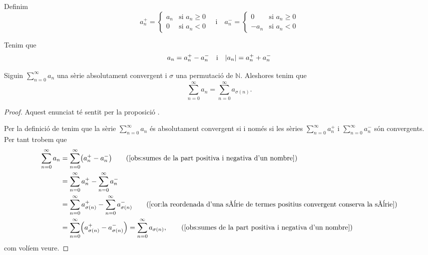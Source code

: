 \documentclass[../../Main.tex]{subfiles}
\begin{document}
	\begin{notation}
		\label{notation:part positiva d'un nombre}
		\label{notation:part negativa d'un nombre}
		Definim
		\[a^{+}_{n}=\begin{cases}
			a_{n} & \text{si }a_{n}\geq0 \\
			0 & \text{si }a_{n}<0
		\end{cases}\quad\text{i}\quad
		a^{-}_{n}=\begin{cases}
			0 & \text{si }a_{n}\geq0 \\
			-a_{n} & \text{si }a_{n}<0
		\end{cases}\]
	\end{notation}
	\begin{observation}
		\label{obs:sumes de la part positiva i negativa d'un nombre}
		Tenim que
		\[a_{n}=a^{+}_{n}-a^{-}_{n}\quad\text{i}\quad\abs{a_{n}}=a^{+}_{n}+a^{-}_{n}\]
	\end{observation}
	\begin{lemma}
		Siguin \(\sum_{n=0}^{\infty}a_{n}\) una sèrie absolutament convergent i \(\sigma\) una permutació de \(\mathbb{N}\). Aleshores tenim que
		\[\sum_{n=0}^{\infty}a_{n}=\sum_{n=0}^{\infty}a_{\sigma(n)}.\]
		\begin{proof}
			Aquest enunciat té sentit per la proposició .
			
			Per la definició de  tenim que la sèrie \(\sum_{n=0}^{\infty}a_{n}\) és absolutament convergent si i només si les sèries \(\sum_{n=0}^{\infty}a^{+}_{n}\) i \(\sum_{n=0}^{\infty}a^{-}_{n}\) són convergents. Per tant trobem que
			\begin{align*}
				\sum_{n=0}^{\infty}a_{n}&=\sum_{n=0}^{\infty}\left(a^{+}_{n}-a^{-}_{n}\right) \tag{\ref{obs:sumes de la part positiva i negativa d'un nombre}}\\
				&=\sum_{n=0}^{\infty}a^{+}_{n}-\sum_{n=0}^{\infty}a^{-}_{n} \\
				&=\sum_{n=0}^{\infty}a^{+}_{\sigma(n)}-\sum_{n=0}^{\infty}a^{-}_{\sigma(n)} \tag{\ref{cor:la reordenada d'una sèrie de termes positius convergent conserva la sèrie}}\\
				&=\sum_{n=0}^{\infty}\left(a^{+}_{\sigma(n)}-a^{-}_{\sigma(n)}\right)=\sum_{n=0}^{\infty}a_{\sigma(n)}, \tag{\ref{obs:sumes de la part positiva i negativa d'un nombre}}
			\end{align*}
			com volíem veure.
		\end{proof}
	\end{lemma}
\end{document}
